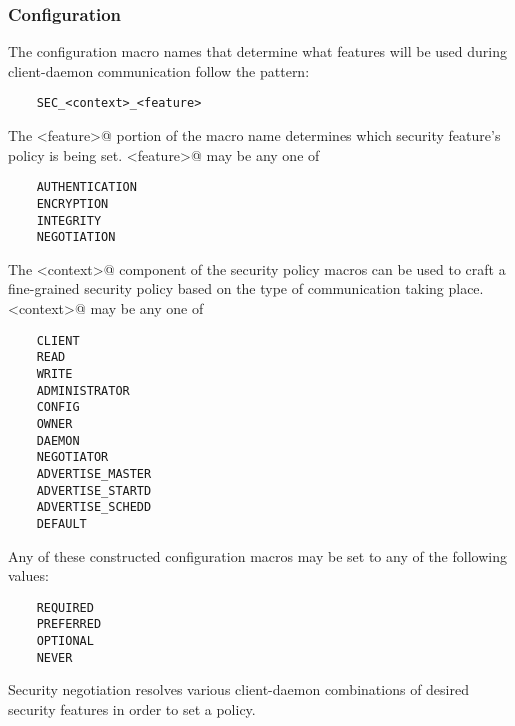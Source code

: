 \subsubsection{\label{sec:security-negotiation-features}Configuration}

The configuration macro names that determine what features will be used during
client-daemon communication follow the pattern:
\begin{verbatim}
    SEC_<context>_<feature>
\end{verbatim}

The \verb@<feature>@
portion of the macro name determines which security feature's
policy is being set.
\verb@<feature>@ may be any one of
\begin{verbatim}
    AUTHENTICATION
    ENCRYPTION
    INTEGRITY
    NEGOTIATION
\end{verbatim}

The \verb@<context>@ component of the security policy macros can be
used to craft a fine-grained security policy based on the type of
communication taking place.
\verb@<context>@ may be any one of
\begin{verbatim}
    CLIENT
    READ
    WRITE
    ADMINISTRATOR
    CONFIG
    OWNER
    DAEMON
    NEGOTIATOR
    ADVERTISE_MASTER
    ADVERTISE_STARTD
    ADVERTISE_SCHEDD
    DEFAULT
\end{verbatim}

Any of these constructed configuration macros may be set to
any of the following values:
\begin{verbatim}
    REQUIRED
    PREFERRED
    OPTIONAL
    NEVER 
\end{verbatim}

Security negotiation resolves various client-daemon combinations
of desired security features in order to set a policy.

